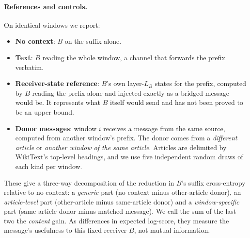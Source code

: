 \paragraph{References and controls.} On identical windows we report:
\begin{itemize}
\item \textbf{No context}: $B$ on the suffix alone.
\item \textbf{Text}: $B$ reading the whole window, \ie{} a channel that forwards the prefix verbatim.
\item \textbf{Receiver-state reference}: $B$'s own layer-$L_B$ states for the prefix, computed by $B$ reading the prefix alone and injected exactly as a bridged message would be. It represents what $B$ itself would send and has not been proved to be an upper bound.
\item \textbf{Donor messages}: window $i$ receives a message from the same source, computed from another window's prefix. The donor comes from a \emph{different article} or \emph{another window of the same article}. Articles are delimited by WikiText's top-level headings, and we use five independent random draws of each kind per window.
\end{itemize}
These give a three-way decomposition of the reduction in $B$'s suffix cross-entropy relative to no context: a \emph{generic} part (no context minus other-article donor), an \emph{article-level} part (other-article minus same-article donor) and a \emph{window-specific} part (same-article donor minus matched message). We call the sum of the last two the \emph{content} gain. As differences in expected log-score, they measure the message's usefulness to this fixed receiver $B$, not mutual information.

